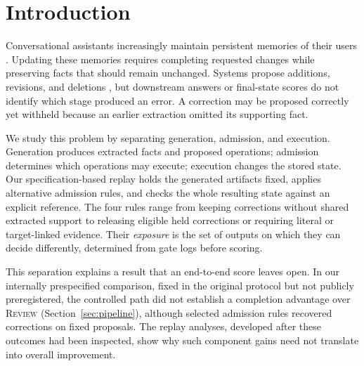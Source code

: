 \documentclass[acmsmall,review,anonymous]{acmart}
\newcommand{\review}{\textsc{Review}}
\begin{document}
\section{Introduction}\label{sec:intro}
Conversational assistants increasingly maintain persistent memories of their users \cite{cite10}. Updating these memories requires completing requested changes while preserving facts that should remain unchanged. Systems propose additions, revisions, and deletions \cite{cite4,cite6,cite21,cite39,cite40}, but downstream answers or final-state scores \cite{cite20,cite37} do not identify which stage produced an error. A correction may be proposed correctly yet withheld because an earlier extraction omitted its supporting fact.

We study this problem by separating generation, admission, and execution. Generation produces extracted facts and proposed operations; admission determines which operations may execute; execution changes the stored state. Our specification-based replay holds the generated artifacts fixed, applies alternative admission rules, and checks the whole resulting state against an explicit reference. The four rules range from keeping corrections without shared extracted support to releasing eligible held corrections or requiring literal or target-linked evidence. Their \emph{exposure} is the set of outputs on which they can decide differently, determined from gate logs before scoring.

This separation explains a result that an end-to-end score leaves open. In our internally prespecified comparison, fixed in the original protocol but not publicly preregistered, the controlled path did not establish a completion advantage over \review{} (Section~\ref{sec:pipeline}), although selected admission rules recovered corrections on fixed proposals. The replay analyses, developed after these outcomes had been inspected, show why such component gains need not translate into overall improvement.
\end{document}
